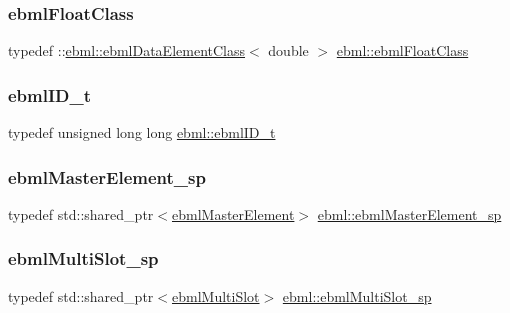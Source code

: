 \subsubsection{\texorpdfstring{ebml\+Float\+Class}{ebmlFloatClass}}
{\footnotesize\ttfamily typedef \+::\mbox{\hyperlink{classebml_1_1ebmlDataElementClass}{ebml\+::ebml\+Data\+Element\+Class}}$<$ double $>$ \mbox{\hyperlink{namespaceebml_a2e365f10ba5435bdd5c1fd909a601f31}{ebml\+::ebml\+Float\+Class}}}

\mbox{\label{namespaceebml_a86c5f604ddf12a74aa9812e997a58691}} 
\subsubsection{\texorpdfstring{ebml\+I\+D\+\_\+t}{ebmlID\_t}}
{\footnotesize\ttfamily typedef unsigned long long \mbox{\hyperlink{namespaceebml_a86c5f604ddf12a74aa9812e997a58691}{ebml\+::ebml\+I\+D\+\_\+t}}}

\mbox{\label{namespaceebml_af0dd39c01f0391f27971528001c1dc0e}} 
\subsubsection{\texorpdfstring{ebml\+Master\+Element\+\_\+sp}{ebmlMasterElement\_sp}}
{\footnotesize\ttfamily typedef std\+::shared\+\_\+ptr$<$\mbox{\hyperlink{classebml_1_1ebmlMasterElement}{ebml\+Master\+Element}}$>$ \mbox{\hyperlink{namespaceebml_af0dd39c01f0391f27971528001c1dc0e}{ebml\+::ebml\+Master\+Element\+\_\+sp}}}

\mbox{\label{namespaceebml_a1e633eb51fcbe25caf953fd159171543}} 
\subsubsection{\texorpdfstring{ebml\+Multi\+Slot\+\_\+sp}{ebmlMultiSlot\_sp}}
{\footnotesize\ttfamily typedef std\+::shared\+\_\+ptr$<$\mbox{\hyperlink{classebml_1_1ebmlMultiSlot}{ebml\+Multi\+Slot}}$>$ \mbox{\hyperlink{namespaceebml_a1e633eb51fcbe25caf953fd159171543}{ebml\+::ebml\+Multi\+Slot\+\_\+sp}}}

